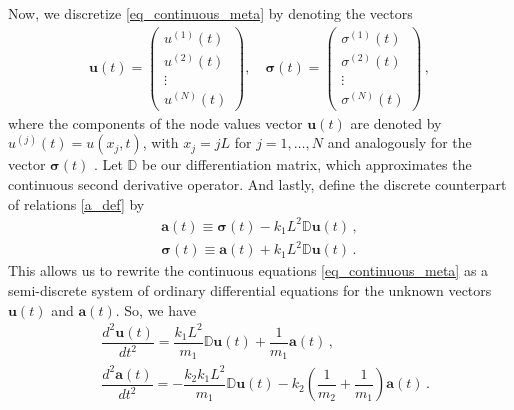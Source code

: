 \documentclass[11pt,a4paper,oneside,openright]{report} %
\begin{document}
Now, we discretize \eqref{eq_continuous_meta} by denoting the vectors
\begin{align}\label{}
    \boldsymbol{u}(t) =
    \begin{pmatrix}
        u^{(1)}(t)\\
        u^{(2)}(t)\\
        \vdots\\
        u^{(N)}(t)
    \end{pmatrix},\quad 
    \boldsymbol{\sigma}(t) =
    \begin{pmatrix}
        \sigma^{(1)}(t)\\
        \sigma^{(2)}(t)\\
        \vdots\\
        \sigma^{(N)}(t)
    \end{pmatrix} \, ,
\end{align}
where the components of the node values vector $\boldsymbol{u}(t)$ are denoted by $u^{(j)}(t)=u(x_j,t)$, with $x_j=jL$ for $j=1, \dots ,N$ and analogously for the vector $\boldsymbol{\sigma}(t)$ \cite{tozzi}. Let $\mathbb{D}$ be our differentiation matrix, which approximates the continuous second derivative operator. And lastly, define the discrete counterpart of relations \eqref{a_def} by
\begin{subequations}
    \begin{align}
    \boldsymbol{a}(t) \equiv \boldsymbol{\sigma}(t) - k_1 L^2 \mathbb{D}\boldsymbol{u}(t) \, , \\[5pt]
    \boldsymbol{ \sigma }(t) \equiv \boldsymbol{a}(t) + k_1 L^2 \mathbb{D}\boldsymbol{u}(t) \, .
    \end{align}
\end{subequations}
This allows us to rewrite the continuous equations \eqref{eq_continuous_meta} as a semi-discrete system of ordinary differential equations for the unknown vectors $\boldsymbol{u}(t)$ and $\boldsymbol{a}(t)$. So, we have
\begin{subequations}\label{eq_meta_step}
    \begin{align}
       & \dfrac{d^2 \boldsymbol{u}(t)}{dt^2} = \dfrac{k_1 L^2}{m_1}\mathbb{D}\boldsymbol{u}(t) + \dfrac{1}{m _1} \boldsymbol{a}(t) \, ,\\[5pt]
       & \dfrac{d^2 \boldsymbol{a}(t)}{dt^2} = -\dfrac{k_2 k_1 L^2}{m_1}\mathbb{D}\boldsymbol{u}(t)-k_2\left(\dfrac{1}{m_2}+\dfrac{1}{m_1}\right) \boldsymbol{a}(t) \, .
    \end{align}
\end{subequations}
\end{document}
